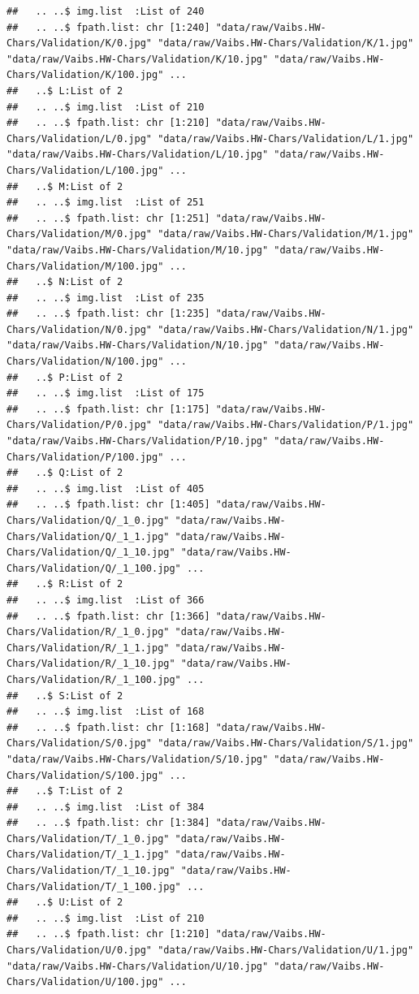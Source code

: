 \documentclass[
]{report}
\begin{document}
\begin{verbatim}
##   .. ..$ img.list  :List of 240
##   .. ..$ fpath.list: chr [1:240] "data/raw/Vaibs.HW-Chars/Validation/K/0.jpg" "data/raw/Vaibs.HW-Chars/Validation/K/1.jpg" "data/raw/Vaibs.HW-Chars/Validation/K/10.jpg" "data/raw/Vaibs.HW-Chars/Validation/K/100.jpg" ...
##   ..$ L:List of 2
##   .. ..$ img.list  :List of 210
##   .. ..$ fpath.list: chr [1:210] "data/raw/Vaibs.HW-Chars/Validation/L/0.jpg" "data/raw/Vaibs.HW-Chars/Validation/L/1.jpg" "data/raw/Vaibs.HW-Chars/Validation/L/10.jpg" "data/raw/Vaibs.HW-Chars/Validation/L/100.jpg" ...
##   ..$ M:List of 2
##   .. ..$ img.list  :List of 251
##   .. ..$ fpath.list: chr [1:251] "data/raw/Vaibs.HW-Chars/Validation/M/0.jpg" "data/raw/Vaibs.HW-Chars/Validation/M/1.jpg" "data/raw/Vaibs.HW-Chars/Validation/M/10.jpg" "data/raw/Vaibs.HW-Chars/Validation/M/100.jpg" ...
##   ..$ N:List of 2
##   .. ..$ img.list  :List of 235
##   .. ..$ fpath.list: chr [1:235] "data/raw/Vaibs.HW-Chars/Validation/N/0.jpg" "data/raw/Vaibs.HW-Chars/Validation/N/1.jpg" "data/raw/Vaibs.HW-Chars/Validation/N/10.jpg" "data/raw/Vaibs.HW-Chars/Validation/N/100.jpg" ...
##   ..$ P:List of 2
##   .. ..$ img.list  :List of 175
##   .. ..$ fpath.list: chr [1:175] "data/raw/Vaibs.HW-Chars/Validation/P/0.jpg" "data/raw/Vaibs.HW-Chars/Validation/P/1.jpg" "data/raw/Vaibs.HW-Chars/Validation/P/10.jpg" "data/raw/Vaibs.HW-Chars/Validation/P/100.jpg" ...
##   ..$ Q:List of 2
##   .. ..$ img.list  :List of 405
##   .. ..$ fpath.list: chr [1:405] "data/raw/Vaibs.HW-Chars/Validation/Q/_1_0.jpg" "data/raw/Vaibs.HW-Chars/Validation/Q/_1_1.jpg" "data/raw/Vaibs.HW-Chars/Validation/Q/_1_10.jpg" "data/raw/Vaibs.HW-Chars/Validation/Q/_1_100.jpg" ...
##   ..$ R:List of 2
##   .. ..$ img.list  :List of 366
##   .. ..$ fpath.list: chr [1:366] "data/raw/Vaibs.HW-Chars/Validation/R/_1_0.jpg" "data/raw/Vaibs.HW-Chars/Validation/R/_1_1.jpg" "data/raw/Vaibs.HW-Chars/Validation/R/_1_10.jpg" "data/raw/Vaibs.HW-Chars/Validation/R/_1_100.jpg" ...
##   ..$ S:List of 2
##   .. ..$ img.list  :List of 168
##   .. ..$ fpath.list: chr [1:168] "data/raw/Vaibs.HW-Chars/Validation/S/0.jpg" "data/raw/Vaibs.HW-Chars/Validation/S/1.jpg" "data/raw/Vaibs.HW-Chars/Validation/S/10.jpg" "data/raw/Vaibs.HW-Chars/Validation/S/100.jpg" ...
##   ..$ T:List of 2
##   .. ..$ img.list  :List of 384
##   .. ..$ fpath.list: chr [1:384] "data/raw/Vaibs.HW-Chars/Validation/T/_1_0.jpg" "data/raw/Vaibs.HW-Chars/Validation/T/_1_1.jpg" "data/raw/Vaibs.HW-Chars/Validation/T/_1_10.jpg" "data/raw/Vaibs.HW-Chars/Validation/T/_1_100.jpg" ...
##   ..$ U:List of 2
##   .. ..$ img.list  :List of 210
##   .. ..$ fpath.list: chr [1:210] "data/raw/Vaibs.HW-Chars/Validation/U/0.jpg" "data/raw/Vaibs.HW-Chars/Validation/U/1.jpg" "data/raw/Vaibs.HW-Chars/Validation/U/10.jpg" "data/raw/Vaibs.HW-Chars/Validation/U/100.jpg" ...

\end{verbatim}
\end{document}
